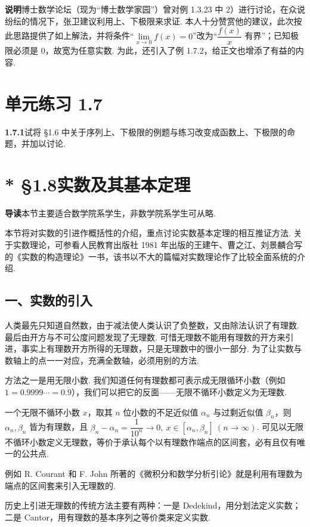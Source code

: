 \documentclass[UTF8,12pt,a4paper,fontset=fandol]{ctexart}
\begin{document}
\noindent\textbf{说明}\quad 博士数学论坛（现为“博士数学家园”）曾对例 1.3.23 中 2）进行讨论，在众说纷纭的情况下，张卫建议利用上、下极限来求证. 本人十分赞赏他的建议，此次按此思路提供了如上解法，并将条件“$\lim\limits_{x\to0}f(x)=0$”改为“$\dfrac{f(x)}x$ 有界”；已知极限必须是 0，故宽为任意实数. 为此，还引入了例 1.7.2，给正文也增添了有益的内容.

\section*{单元练习 1.7}

\noindent\textbf{1.7.1}\quad 试将 §1.6 中关于序列上、下极限的例题与练习改变成函数上、下极限的命题，并加以讨论.

\section*{* §1.8\quad 实数及其基本定理}

\noindent\textbf{导读}\quad 本节主要适合数学院系学生，非数学院系学生可从略.

本节将对实数的引进作概括性的介绍，重点讨论实数基本定理的相互推证方法. 关于实数理论，可参看人民教育出版社 1981 年出版的王建午、曹之江、刘景麟合写的《实数的构造理论》一书，该书以不大的篇幅对实数理论作了比较全面系统的介绍.

\subsection*{一、实数的引入}

人类最先只知道自然数，由于减法使人类认识了负整数，又由除法认识了有理数. 最后由开方与不可公度问题发现了无理数. 可惜无理数不能用有理数的开方来引进，事实上有理数开方所得的无理数，只是无理数中的很小一部分. 为了让实数与数轴上的点一一对应，充满全数轴，必须用别的方法.

方法之一是用无限小数. 我们知道任何有理数都可表示成无限循环小数（例如 $1=0.9999\cdots=0.\dot9$），我们可以把它的反面——无限不循环小数定义为无理数.

一个无限不循环小数 $x$，取其 $n$ 位小数的不足近似值 $\alpha_n$ 与过剩近似值 $\beta_n$，则 $\alpha_n,\beta_n$ 皆为有理数，且 $\beta_n-\alpha_n=\dfrac1{10^n}\to0,\ x\in[\alpha_n,\beta_n]\ (n\to\infty)$. 可见以无限不循环小数定义无理数，等价于承认每个以有理数作端点的区间套，必有且仅有唯一的公共点.

例如 R. Courant 和 F. John 所著的《微积分和数学分析引论》就是利用有理数为端点的区间套来引入无理数的.

历史上引进无理数的传统方法主要有两种：一是 Dedekind，用分划法定义实数；二是 Cantor，用有理数的基本序列之等价类来定义实数.
\end{document}
